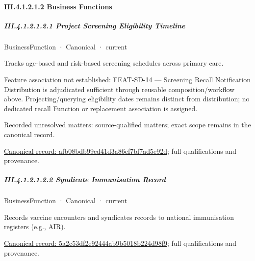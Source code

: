 \paragraph*{III.4.1.2.1.2 Business Functions}
\label{navigation:III.4.1.2.1.2}

\subparagraph*{III.4.1.2.1.2.1 Project Screening Eligibility Timeline}
\label{navigation:III.4.1.2.1.2.1}

\label{element:afb08bdb99cd41d3a86ef7bf7ad5e92d}
{\small BusinessFunction · Canonical · current}\par

Tracks age-based and risk-based screening schedules across primary care.



Feature association not established: FEAT-SD-14 — Screening Recall Notification Distribution is adjudicated sufficient through reusable composition/workflow above. Projecting/querying eligibility dates remains distinct from distribution; no dedicated recall Function or replacement association is assigned.


{\small Recorded unresolved matters: source-qualified matters; exact scope remains in the canonical record.}\par
{\footnotesize \href{../../../../continuum/business/business-function/afb08bdb99cd41d3a86ef7bf7ad5e92d.md}{Canonical record: afb08bdb99cd41d3a86ef7bf7ad5e92d}; full qualifications and provenance.}\par
\subparagraph*{III.4.1.2.1.2.2 Syndicate Immunisation Record}
\label{navigation:III.4.1.2.1.2.2}

\label{element:5a2c53df2e92444ab9b5018b224d98f9}
{\small BusinessFunction · Canonical · current}\par

Records vaccine encounters and syndicates records to national immunisation registers (e.g., AIR).


{\footnotesize \href{../../../../continuum/business/business-function/5a2c53df2e92444ab9b5018b224d98f9.md}{Canonical record: 5a2c53df2e92444ab9b5018b224d98f9}; full qualifications and provenance.}\par
